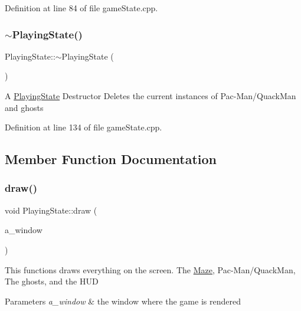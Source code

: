 Definition at line 84 of file game\+State.\+cpp.

\mbox{\label{class_playing_state_afd96eb2be532e40c9db2f9607e4ea284}} 
\subsubsection{\texorpdfstring{$\sim$\+Playing\+State()}{~PlayingState()}}
{\footnotesize\ttfamily Playing\+State\+::$\sim$\+Playing\+State (\begin{DoxyParamCaption}{ }\end{DoxyParamCaption})}

A \hyperlink{class_playing_state}{Playing\+State} Destructor Deletes the current instances of Pac-\/\+Man/\+Quack\+Man and ghosts 

Definition at line 134 of file game\+State.\+cpp.



\subsection{Member Function Documentation}
\mbox{\label{class_playing_state_aa6c7033a5c734ba1ae4aae0905554d61}} 
\subsubsection{\texorpdfstring{draw()}{draw()}}
{\footnotesize\ttfamily void Playing\+State\+::draw (\begin{DoxyParamCaption}\item[{sf\+::\+Render\+Window \&}]{a\+\_\+window }\end{DoxyParamCaption})\hspace{0.3cm}{\ttfamily [virtual]}}

This functions draws everything on the screen. The \hyperlink{class_maze}{Maze}, Pac-\/\+Man/\+Quack\+Man, The ghosts, and the H\+UD


\begin{DoxyParams}{Parameters}
{\em a\+\_\+window} & the window where the game is rendered \\
\hline
\end{DoxyParams}


